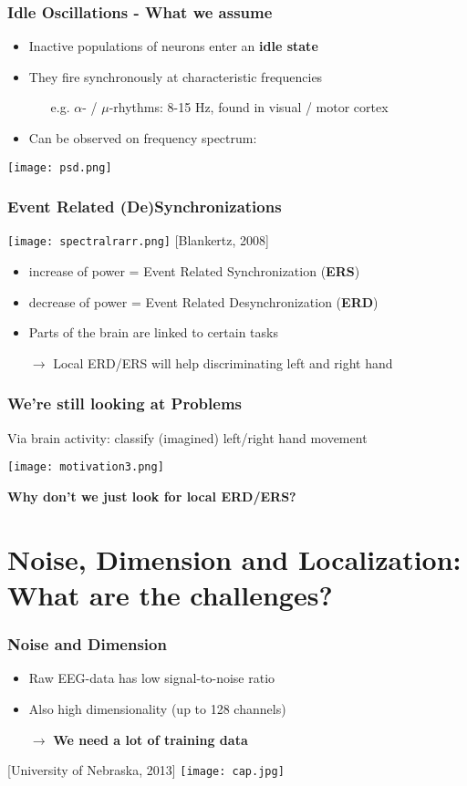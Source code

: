 \documentclass{beamer}
\begin{document}
\begin{frame}
\frametitle{Idle Oscillations - What we assume}
\begin{itemize}
	\item Inactive populations of neurons enter an {\bf idle state}
	\item They fire synchronously at characteristic frequencies
	\begin{itemize}
		\item[] e.g. $\alpha$- / $\mu$-rhythms: 8-15 Hz, found in visual / motor cortex
	\end{itemize}
	\item Can be observed on frequency spectrum:
	\end{itemize}
	\centering
	\texttt{[image: psd.png]}
\end{frame}

\begin{frame}
\frametitle{Event Related (De)Synchronizations}
	\texttt{[image: spectralrarr.png]}
	{\tiny [Blankertz, 2008]}
	\begin{itemize}
	\item increase of power = Event Related Synchronization ({\bf ERS})
	\item decrease of power = Event Related Desynchronization ({\bf ERD})
	\item Parts of the brain are linked to certain tasks
	\item[$\rightarrow$] Local ERD/ERS will help discriminating left and right hand
	\end{itemize}
\end{frame}

\begin{frame}
\frametitle{We're still looking at Problems}
	Via brain activity: classify (imagined) left/right hand movement \\
	\begin{center}
	\texttt{[image: motivation3.png]}
	\end{center}
	{\bf Why don't we just look for local ERD/ERS?}
\end{frame}


\section{Noise, Dimension and Localization: What are the challenges?}

\begin{frame}
\frametitle{Noise and Dimension}
\begin{itemize}
 	\item Raw EEG-data has low signal-to-noise ratio
 	\item Also high dimensionality (up to 128 channels)
 	\item[$\rightarrow$]{\bf We need a lot of training data}
\end{itemize}
\centering
	{\tiny [University of Nebraska, 2013]}
 	\texttt{[image: cap.jpg]}
\end{frame}
\end{document}

